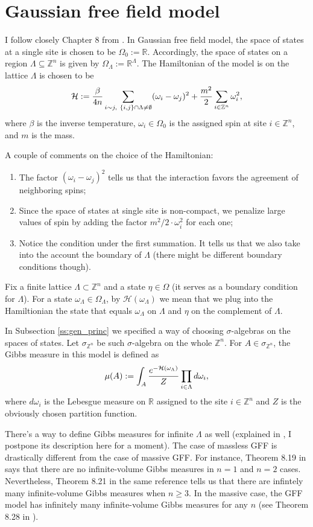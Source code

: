 \section{Gaussian free field model}
I follow closely Chapter 8 from \cite{friedli}. In Gaussian free field model, the space of states at a single site is chosen to be $\Omega_0 := \mathbb R$. Accordingly, the space of states on a region $\Lambda \subseteq \mathbb Z^n$ is given by $\Omega_{\Lambda} := \mathbb R^{\Lambda}$. The Hamiltonian of the model is on the lattice $\Lambda$ is chosen to be
\[
\mathcal{H} := \frac{\beta}{4n} \sum_{i \sim j, \ \{i,j\}\cap \Lambda \neq \emptyset} (\omega_i - \omega_j)^2 + \frac{m^2}{2} \sum_{i \in \mathbb Z^n} \omega_i^2,
\]
where $\beta$ is the inverse temperature, $\omega_i \in \Omega_0$ is the assigned spin at site $i \in \mathbb Z^n$, and $m$ is the mass.

A couple of comments on the choice of the Hamiltonian:
\begin{enumerate}[1)]
\item The factor $(\omega_i-\omega_j)^2$ tells us that the interaction favors the agreement of neighboring spins;
\item Since the space of states at single site is non-compact, we penalize large values of spin by adding the factor $m^2/2 \cdot \omega_i^2$ for each one;
\item Notice the condition under the first summation. It tells us that we also take into the account the boundary of $\Lambda$ (there might be different boundary conditions though).
\end{enumerate}
Fix a finite lattice $\Lambda \subset \mathbb Z^n$ and a state $\eta \in \Omega$ (it serves as a boundary condition for $\Lambda$). For a state $\omega_{\Lambda} \in \Omega_{\Lambda}$, by $\mathcal H(\omega_{\Lambda})$ we mean that we plug into the Hamiltionian the state that equals $\omega_{\Lambda}$ on $\Lambda$ and $\eta$ on the complement of $\Lambda$.

In Subsection \ref{ss:gen_princ} we specified a way of choosing $\sigma$-algebras on the spaces of states. Let $\sigma_{\mathbb Z^n}$ be such $\sigma$-algebra on the whole $\mathbb Z^n$. For $A \in \sigma_{\mathbb Z^n}$, the Gibbs measure in this model is defined as
\[
\mu(A) := \int_A \frac{e^{-\mathcal{H}(\omega_{\Lambda})}}{Z} \prod_{i \in \Lambda} d\omega_i,
\]
where $d\omega_i$ is the Lebesgue measure on $\mathbb R$ assigned to the site $i \in \mathbb Z^n$ and $Z$ is the obviously chosen partition function. 

There's a way to define Gibbs measures for infinite $\Lambda$ as well (explained in \cite{friedli}, I postpone its description here for a moment). The case of massless GFF is drastically different from the case of massive GFF. For instance, Theorem 8.19 in \cite{friedli} says that there are no infinite-volume Gibbs measures in $n=1$ and $n=2$ cases. Nevertheless, Theorem 8.21 in the same reference tells us that there are infintely many infinite-volume Gibbs measures when $n \geq 3$. In the massive case, the GFF model has infinitely many infinite-volume Gibbs measures for any $n$ (see Theorem 8.28 in \cite{friedli}).